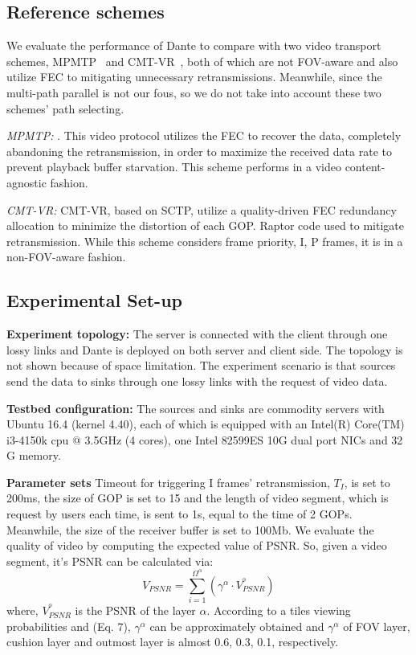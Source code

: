\subsection{Reference schemes}
We evaluate the performance of Dante to compare with two video transport schemes, MPMTP~\cite{MPMTP} and CMT-VR~\cite{CMT-VR}, both of which are not FOV-aware and also utilize FEC to mitigating unnecessary retransmissions. Meanwhile, since the multi-path parallel is not our fous, so we do not take into account these two schemes' path selecting. 
\begin{packeditemize}

\item {\em MPMTP\cite{MPMTP}:} .
This video protocol utilizes the FEC to recover the data,  completely abandoning the retransmission,  in order to maximize the received data rate to prevent playback buffer starvation. This scheme performs in a video content-agnostic fashion. 

\item {\em CMT-VR\cite{CMT-VR}:}
CMT-VR, based on SCTP, utilize a quality-driven FEC redundancy  allocation to minimize the distortion of each GOP. Raptor code used to mitigate retransmission. While this scheme considers frame priority, \ie I, P frames, it is in a non-FOV-aware fashion. 

\end{packeditemize}


\subsection{Experimental Set-up}
\textbf{Experiment topology:} The server is connected with the client through one lossy links and Dante is deployed on both server and client side. The topology is not shown because of space limitation. The experiment scenario is that sources send the data to sinks through one lossy links with the request of video data.

\textbf{Testbed configuration:} The sources and sinks are commodity servers with Ubuntu 16.4 (kernel 4.40), each of which is equipped with an Intel(R) Core(TM) i3-4150k cpu @ 3.5GHz (4 cores), one Intel 82599ES 10G dual port NICs and 32 G memory.

\textbf{Parameter sets}
Timeout for triggering I frames' retransmission, $T_I$, is set to 200ms, the size of GOP is set to 15 and the length of video segment, which is request by users each time, is sent to 1s, equal to the time of 2 GOPs. Meanwhile, the size of the receiver buffer is set to 100Mb.
We evaluate the quality of video by computing the expected value of PSNR. So, given a video segment, it's PSNR can be calculated via: \[{V_{PSNR}} = \sum\limits_{i = 1}^{{\Omega ^\alpha }} {({\gamma ^\alpha } \cdot V_{PSNR}^{^\alpha })} \]
where, ${V_{PSNR}^{^\alpha }}$ is the PSNR of the layer $\alpha$. According to a tiles viewing probabilities \cite{360ProbDASH} and (Eq. 7), $\gamma ^\alpha$ can be approximately obtained and $\gamma ^\alpha$ of FOV layer, cushion layer and outmost layer is almost 0.6, 0.3, 0.1, respectively.

